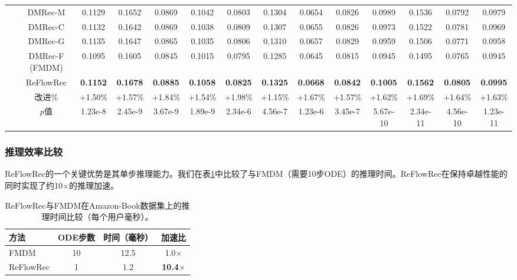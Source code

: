 \documentclass[sigconf]{acmart}
\begin{document}
\begin{table}
\begin{tabular}{c|c|cccc|cccc|cccc}
    \cline{2-14}
    ~ &\textsf{DMRec-M} & 0.1129 & 0.1652 & 0.0869 & 0.1042 & 0.0803 & 0.1304 & 0.0654 & 0.0826 & 0.0989 & 0.1536 & 0.0792 & 0.0979\\
    ~ & \textsf{DMRec-C} & 0.1132 & 0.1642 & 0.0869 & 0.1038 & 0.0809 & 0.1307 & 0.0655 & 0.0826 & 0.0973 & 0.1522 & 0.0781 & 0.0969\\
    ~ & \textsf{DMRec-G} & 0.1135 & 0.1647 & 0.0865 & 0.1035 & 0.0806 & 0.1310 & 0.0657 & 0.0829 & 0.0959 & 0.1506 & 0.0771 & 0.0958\\
    ~ & \textsf{DMRec-F} (FMDM) & 0.1095 & 0.1605 & 0.0845 & 0.1015 & 0.0795 & 0.1285 & 0.0645 & 0.0815 & 0.0945 & 0.1495 & 0.0765 & 0.0945\\
    \cline{2-14}
    ~ & \textsf{ReFlowRec} & \textbf{0.1152} & \textbf{0.1678} & \textbf{0.0885} & \textbf{0.1058} & \textbf{0.0825} & \textbf{0.1325} & \textbf{0.0668} & \textbf{0.0842} & \textbf{0.1005} & \textbf{0.1562} & \textbf{0.0805} & \textbf{0.0995}\\
    \cline{2-14}
     ~ & 改进\% & +1.50\% & +1.57\% & +1.84\% & +1.54\% & +1.98\% & +1.15\% & +1.67\% & +1.57\% & +1.62\% & +1.69\% & +1.64\% & +1.63\%\\
     ~ & $p$值 & 1.23e-8 & 2.45e-9 & 3.67e-9 & 1.89e-9 & 2.34e-6 & 4.56e-7 & 1.23e-6 & 3.45e-7 & 5.67e-10 & 2.34e-11 & 4.56e-10 & 1.23e-11\\
\hline
  \end{tabular}
\end{table}

\subsubsection{\textbf{推理效率比较}}
\textsf{ReFlowRec}的一个关键优势是其单步推理能力。我们在表\ref{inference_time}中比较了与FMDM（需要10步ODE）的推理时间。\textsf{ReFlowRec}在保持卓越性能的同时实现了约10$\times$的推理加速。

\begin{table}[t]
\small
\setlength{\abovecaptionskip}{0.1cm}
\setlength{\belowcaptionskip}{0.1cm} 
  \caption{\textsf{ReFlowRec}与FMDM在Amazon-Book数据集上的推理时间比较（每个用户毫秒）。}
  \label{inference_time}
  \begin{tabular}{l|c|c|c}
    \hline
    \textbf{方法} & \textbf{ODE步数} & \textbf{时间（毫秒）} & \textbf{加速比}\\
    \hline
    FMDM & 10 & 12.5 & 1.0$\times$\\
    \textsf{ReFlowRec} & 1 & 1.2 & \textbf{10.4$\times$}\\
    \hline
  \end{tabular}
\end{table}
\end{document}
